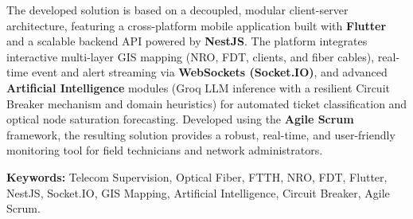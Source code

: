 The developed solution is based on a decoupled, modular client-server architecture, featuring a cross-platform mobile application built with \textbf{Flutter} and a scalable backend API powered by \textbf{NestJS}. The platform integrates interactive multi-layer GIS mapping (NRO, FDT, clients, and fiber cables), real-time event and alert streaming via \textbf{WebSockets (Socket.IO)}, and advanced \textbf{Artificial Intelligence} modules (Groq LLM inference with a resilient Circuit Breaker mechanism and domain heuristics) for automated ticket classification and optical node saturation forecasting. Developed using the \textbf{Agile Scrum} framework, the resulting solution provides a robust, real-time, and user-friendly monitoring tool for field technicians and network administrators.

\textbf{Keywords:} Telecom Supervision, Optical Fiber, FTTH, NRO, FDT, Flutter, NestJS, Socket.IO, GIS Mapping, Artificial Intelligence, Circuit Breaker, Agile Scrum.
